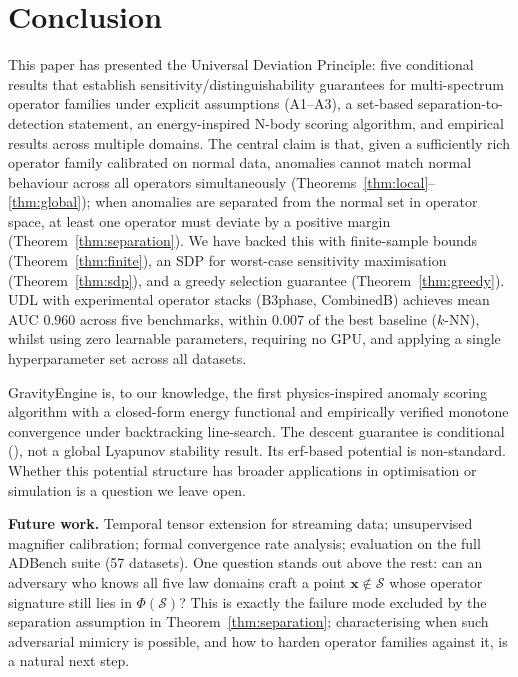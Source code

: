 \documentclass{article}
\newcommand{\Nset}{\mathcal{S}}  %
\begin{document}
\section{Conclusion}

This paper has presented the Universal Deviation Principle: five conditional results that establish sensitivity/distinguishability guarantees for multi-spectrum operator families under explicit assumptions (A1--A3), a set-based separation-to-detection statement, an energy-inspired N-body scoring algorithm, and empirical results across multiple domains. The central claim is that, given a sufficiently rich operator family calibrated on normal data, anomalies cannot match normal behaviour across all operators simultaneously (Theorems~\ref{thm:local}--\ref{thm:global}); when anomalies are separated from the normal set in operator space, at least one operator must deviate by a positive margin (Theorem~\ref{thm:separation}). We have backed this with finite-sample bounds (Theorem~\ref{thm:finite}), an SDP for worst-case sensitivity maximisation (Theorem~\ref{thm:sdp}), and a greedy selection guarantee (Theorem~\ref{thm:greedy}). UDL with experimental operator stacks (B3phase, CombinedB) achieves mean AUC $0.960$ across five benchmarks, within $0.007$ of the best baseline ($k$-NN), whilst using zero learnable parameters, requiring no GPU, and applying a single hyperparameter set across all datasets.

GravityEngine is, to our knowledge, the first physics-inspired anomaly scoring algorithm with a closed-form energy functional and empirically verified monotone convergence under backtracking line-search. The descent guarantee is conditional (), not a global Lyapunov stability result. Its erf-based potential is non-standard. Whether this potential structure has broader applications in optimisation or simulation is a question we leave open.

\textbf{Future work.} Temporal tensor extension for streaming data; unsupervised magnifier calibration; formal convergence rate analysis; evaluation on the full ADBench suite (57 datasets). One question stands out above the rest: can an adversary who knows all five law domains craft a point $\mathbf{x}\notin\Nset$ whose operator signature still lies in $\Phi(\Nset)$? This is exactly the failure mode excluded by the separation assumption in Theorem~\ref{thm:separation}; characterising when such adversarial mimicry is possible, and how to harden operator families against it, is a natural next step.
\end{document}
